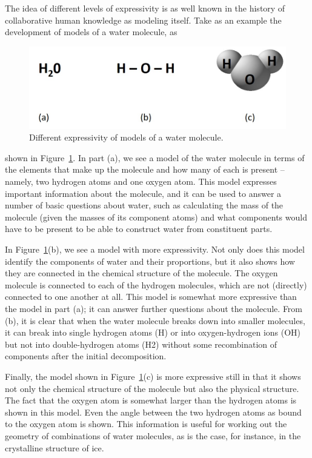 The idea of different levels of expressivity is as well known in the
history of collaborative human knowledge as modeling itself. Take as an
example the development of models of a water molecule, as

\begin{figure}
    \centering
    \includegraphics[width=5.0in]{media/ch2/figure-02-04.jpg}
    \caption{Different expressivity of models of a water molecule.}
    \label{fig:ch2.4}
\end{figure}


shown in Figure~\ref{fig:ch2.4}. In part (a), we see a model of the water molecule
in terms of the elements that make up the molecule and how many of each
is present -- namely, two hydrogen atoms and one oxygen atom. This model
expresses important information about the molecule, and it can be used
to answer a number of basic questions about water, such as calculating
the mass of the molecule (given the masses of its component atoms) and
what components would have to be present to be able to construct water
from constituent parts.

In Figure~\ref{fig:ch2.4}(b), we see a model with more expressivity. Not only does
this model identify the components of water and their proportions, but
it also shows how they are connected in the chemical structure of the
molecule. The oxygen molecule is connected to each of the hydrogen
molecules, which are not (directly) connected to one another at all.
This model is somewhat more expressive than the model in part (a); it
can answer further questions about the molecule. From (b), it is clear
that when the water molecule breaks down into smaller molecules, it can
break into single hydrogen atoms (H) or into oxygen-hydrogen ions (OH)
but not into double-hydrogen atoms (H2) without some recombination of
components after the initial decomposition.

Finally, the model shown in Figure~\ref{fig:ch2.4}(c) is more expressive still in
that it shows not only the chemical structure of the molecule but also
the physical structure. The fact that the oxygen atom is somewhat larger
than the hydrogen atoms is shown in this model. Even the angle between
the two hydrogen atoms as bound to the oxygen atom is shown. This
information is useful for working out the geometry of combinations of
water molecules, as is the case, for instance, in the crystalline
structure of ice.

